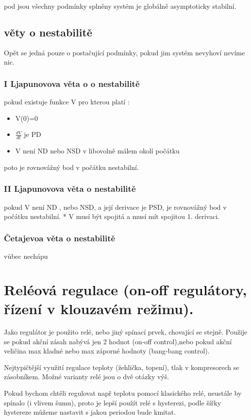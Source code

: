 pod jsou všechny podmínky splněny systém je globálně asymptoticky stabilní.

\subsection{věty o nestabilitě}
Opět se jedná pouze o postačující podmínky, pokud jim systém nevyhoví nevíme nic.

\subsubsection{I Ljapunovova věta o o nestabilitě}
pokud existuje funkce V pro kterou platí :
\begin{itemize}
    \item V(0)=0
    \item $\frac{dV}{dt}$ je PD
    \item V není ND nebo NSD v libovolně málem okolí počátku
\end{itemize}
poto je rovnovážný bod v počátku nestabilní.

\subsubsection{II Ljapunovova věta o nestabilitě}
pokud V není ND , nebo NSD, a její derivace je PSD, je rovnovážný bod v počátku nestabilní.
* V musí být spojitá a musí mít spojitou 1. derivaci.
\subsubsection{Četajevoa věta o nestabilitě}
vůbec nechápu

\section{Reléová regulace (on-off regulátory, řízení v klouzavém režimu).
 }

Jako regulátor je použito relé, nebo jiný spínací prvek, chovající se stejně.
Použije se pokud akční zásah nabývá jen 2 hodnot (on-off control),nebo pokud akční veličina max kladné nebo max záporné hodnoty (bang-bang control).

Nejtypičtější využití regulace teploty (žehlička, topení), tlak v kompresorech se zásobníkem.
Možné varianty relé jsou o dvě otázky výš.

Pokud bychom chtěli regulovat např teplotu pomocí klasického relé, neustále by spínalo (i vlivem šumu), proto je lepší použít relé s hysterezi, podle šířky hystereze můžeme nastavit s jakou periodou bude kmitat.

